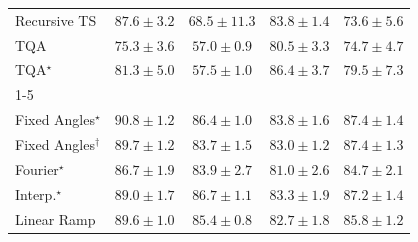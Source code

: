 \begin{tabular}{l|cccc|}
Recursive TS & {\cellcolor[HTML]{913204}} \color[HTML]{F1F1F1} $87.6\pm 3.2$ & {\cellcolor[HTML]{FEC14C}} \color[HTML]{000000} $68.5\pm 11.3$ & {\cellcolor[HTML]{BB4403}} \color[HTML]{F1F1F1} $83.8\pm 1.4$ & {\cellcolor[HTML]{FB9225}} \color[HTML]{000000} $73.6\pm 5.6$ \\
TQA & {\cellcolor[HTML]{F5841E}} \color[HTML]{F1F1F1} $75.3\pm 3.6$ & {\cellcolor[HTML]{FFFACD}} \color[HTML]{000000} $57.0\pm 0.9$ & {\cellcolor[HTML]{D75908}} \color[HTML]{F1F1F1} $80.5\pm 3.3$ & {\cellcolor[HTML]{F78921}} \color[HTML]{F1F1F1} $74.7\pm 4.7$ \\
TQA$^\star$ & {\cellcolor[HTML]{D25306}} \color[HTML]{F1F1F1} $81.3\pm 5.0$ & {\cellcolor[HTML]{FFF9C7}} \color[HTML]{000000} $57.5\pm 1.0$ & {\cellcolor[HTML]{9E3604}} \color[HTML]{F1F1F1} $86.4\pm 3.7$ & {\cellcolor[HTML]{DE610C}} \color[HTML]{F1F1F1} $79.5\pm 7.3$ \\
\cline{1-5}
\multicolumn{5}{c}{\rule{0pt}{8pt}PP} \\
\midrule
Fixed Angles$^\star$ & {\cellcolor[HTML]{004A2B}} \color[HTML]{F1F1F1} $90.8\pm 1.2$ & {\cellcolor[HTML]{036B38}} \color[HTML]{F1F1F1} $86.4\pm 1.0$ & {\cellcolor[HTML]{177B3F}} \color[HTML]{F1F1F1} $83.8\pm 1.6$ & {\cellcolor[HTML]{006435}} \color[HTML]{F1F1F1} $87.4\pm 1.4$ \\
Fixed Angles$^\dagger$ & {\cellcolor[HTML]{00522E}} \color[HTML]{F1F1F1} $89.7\pm 1.2$ & {\cellcolor[HTML]{177B3F}} \color[HTML]{F1F1F1} $83.7\pm 1.5$ & {\cellcolor[HTML]{1D7F41}} \color[HTML]{F1F1F1} $83.0\pm 1.2$ & {\cellcolor[HTML]{006435}} \color[HTML]{F1F1F1} $87.4\pm 1.3$ \\
Fourier$^\star$ & {\cellcolor[HTML]{016937}} \color[HTML]{F1F1F1} $86.7\pm 1.9$ & {\cellcolor[HTML]{167A3F}} \color[HTML]{F1F1F1} $83.9\pm 2.7$ & {\cellcolor[HTML]{2B8E4A}} \color[HTML]{F1F1F1} $81.0\pm 2.6$ & {\cellcolor[HTML]{11753D}} \color[HTML]{F1F1F1} $84.7\pm 2.1$ \\
Interp.$^\star$ & {\cellcolor[HTML]{005830}} \color[HTML]{F1F1F1} $89.0\pm 1.7$ & {\cellcolor[HTML]{016937}} \color[HTML]{F1F1F1} $86.7\pm 1.1$ & {\cellcolor[HTML]{1A7D40}} \color[HTML]{F1F1F1} $83.3\pm 1.9$ & {\cellcolor[HTML]{006636}} \color[HTML]{F1F1F1} $87.2\pm 1.4$ \\
Linear Ramp & {\cellcolor[HTML]{00532F}} \color[HTML]{F1F1F1} $89.6\pm 1.0$ & {\cellcolor[HTML]{0B713B}} \color[HTML]{F1F1F1} $85.4\pm 0.8$ & {\cellcolor[HTML]{1F8142}} \color[HTML]{F1F1F1} $82.7\pm 1.8$ & {\cellcolor[HTML]{086E3A}} \color[HTML]{F1F1F1} $85.8\pm 1.2$ \\

\end{tabular}
